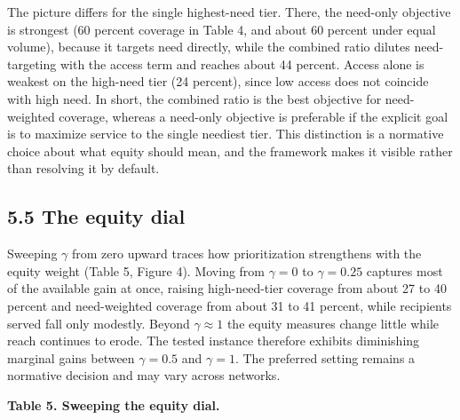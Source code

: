 \documentclass[
  11pt,
]{article}
\begin{document}
The picture differs for the single highest-need tier. There, the
need-only objective is strongest (60 percent coverage in Table 4, and
about 60 percent under equal volume), because it targets need directly,
while the combined ratio dilutes need-targeting with the access term and
reaches about 44 percent. Access alone is weakest on the high-need tier
(24 percent), since low access does not coincide with high need. In
short, the combined ratio is the best objective for need-weighted
coverage, whereas a need-only objective is preferable if the explicit
goal is to maximize service to the single neediest tier. This
distinction is a normative choice about what equity should mean, and the
framework makes it visible rather than resolving it by default.

\subsection{5.5 The equity dial}\label{the-equity-dial}

Sweeping \(\gamma\) from zero upward traces how prioritization
strengthens with the equity weight (Table 5, Figure 4). Moving from
\(\gamma = 0\) to \(\gamma = 0.25\) captures most of the available gain
at once, raising high-need-tier coverage from about 27 to 40 percent and
need-weighted coverage from about 31 to 41 percent, while recipients
served fall only modestly. Beyond \(\gamma \approx 1\) the equity
measures change little while reach continues to erode. The tested
instance therefore exhibits diminishing marginal gains between
\(\gamma = 0.5\) and \(\gamma = 1\). The preferred setting remains a
normative decision and may vary across networks.

\textbf{Table 5. Sweeping the equity dial.}
\end{document}
